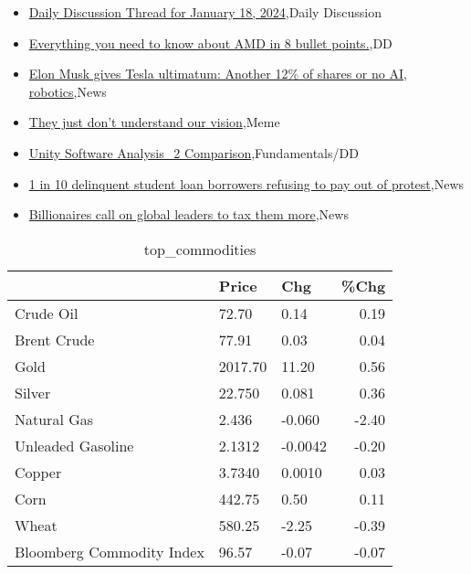 \documentclass{article}%
\begin{document}
%
\begin{itemize}%
\item%
\href{https://reddit.com/r/wallstreetbets/comments/199nltw/daily\_discussion\_thread\_for\_january\_18\_2024/}{Daily Discussion Thread for January 18, 2024},Daily Discussion%
\item%
\href{https://reddit.com/r/wallstreetbets/comments/199mogx/everything\_you\_need\_to\_know\_about\_amd\_in\_8\_bullet/}{Everything you need to know about AMD in 8 bullet points.},DD%
\item%
\href{https://reddit.com/r/wallstreetbets/comments/199lq4d/elon\_musk\_gives\_tesla\_ultimatum\_another\_12\_of/}{Elon Musk gives Tesla ultimatum: Another 12\% of shares or no AI, robotics},News%
\item%
\href{https://reddit.com/r/wallstreetbets/comments/199k2f0/they\_just\_dont\_understand\_our\_vision/}{They just don't understand our vision},Meme%
\item%
\href{https://reddit.com/r/StockMarket/comments/199jpwd/unity\_software\_analysis\_2\_comparison/}{Unity Software Analysis\_2 Comparison},Fundamentals/DD%
\item%
\href{https://reddit.com/r/Economics/comments/199jr5h/1\_in\_10\_delinquent\_student\_loan\_borrowers/}{1 in 10 delinquent student loan borrowers refusing to pay out of protest},News%
\item%
\href{https://reddit.com/r/Economics/comments/199icid/billionaires\_call\_on\_global\_leaders\_to\_tax\_them/}{Billionaires call on global leaders to tax them more},News%
\end{itemize}%


\begin{table}[htbp]%
\caption{top\_commodities}%
\centering%
\begin{adjustbox}{width=1\textwidth}%
\begin{tabular}{lllr}
\toprule
                          &   Price &     Chg &  \%Chg \\
\midrule
               Crude Oil  &   72.70 &    0.14 &  0.19 \\
             Brent Crude  &   77.91 &    0.03 &  0.04 \\
                    Gold  & 2017.70 &   11.20 &  0.56 \\
                  Silver  &  22.750 &   0.081 &  0.36 \\
             Natural Gas  &   2.436 &  -0.060 & -2.40 \\
       Unleaded Gasoline  &  2.1312 & -0.0042 & -0.20 \\
                  Copper  &  3.7340 &  0.0010 &  0.03 \\
                    Corn  &  442.75 &    0.50 &  0.11 \\
                   Wheat  &  580.25 &   -2.25 & -0.39 \\
Bloomberg Commodity Index &   96.57 &   -0.07 & -0.07 \\
\bottomrule
\end{tabular}
%
\end{adjustbox}%
\end{table}
\end{document}
